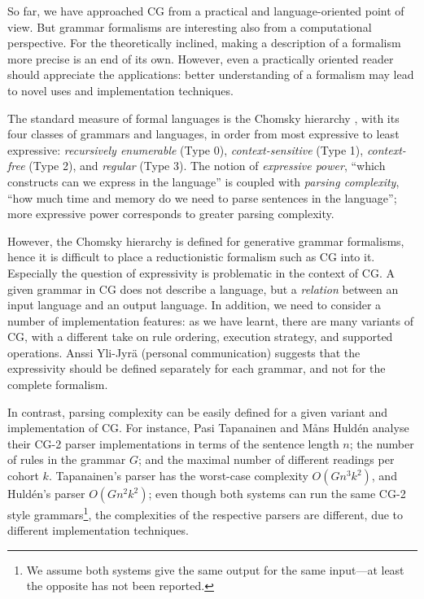 So far, we have approached CG from a practical and language-oriented point of view. 
But grammar formalisms are interesting also from a computational perspective. 
For the theoretically inclined, making a description of a formalism more precise 
is an end of its own. 
However, even a practically oriented reader should appreciate the applications: 
better understanding of a formalism may lead to novel uses and implementation techniques. 

The standard measure of formal languages is the Chomsky hierarchy \cite{chomsky1956hierarchy}, with its four classes of grammars and languages, in order from most expressive to least expressive: \emph{recursively enumerable} (Type 0), \emph{context-sensitive} (Type 1), \emph{context-free} (Type 2), and \emph{regular} (Type 3). 
The notion of \emph{expressive power}, ``which constructs can we express in the language'' is coupled with \emph{parsing complexity}, ``how much time and memory do we need to parse sentences in the language''; more expressive power corresponds to greater parsing complexity. 



However, the Chomsky hierarchy is defined for generative grammar formalisms, hence it is difficult to place a reductionistic formalism such as CG into it. 
Especially the question of expressivity is problematic in the context of CG. 
A given grammar in CG does not describe a language, but a \emph{relation} between an input language and an output language. %
In addition, we need to consider a number of implementation features: 
as we have learnt, there are many variants of CG, 
with a different take on rule ordering, execution strategy, 
and supported operations. 
Anssi Yli-Jyrä (personal communication) suggests that the 
expressivity should be defined separately for each grammar, and not for the complete formalism. 

In contrast, parsing complexity can be easily defined for a given variant and implementation of CG. 
For instance, Pasi Tapanainen \cite{tapanainen1999phd} and Måns Huldén \cite{hulden2011cg_engine} analyse their CG-2 parser implementations 
in terms of the sentence length $n$; 
the number of rules in the grammar $G$; and the maximal number of different readings per cohort $k$. Tapanainen's parser has the worst-case complexity $O(Gn^3k^2)$, and Huldén's parser $O(Gn^2k^2)$;
even though both systems can run the same CG-2 style grammars\footnote{We assume both systems give the same output for the same input---at least the opposite has not been reported.}, the complexities of the respective parsers are different, due to different implementation techniques. 


